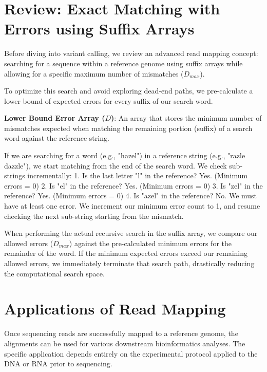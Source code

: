 

\section{Review: Exact Matching with Errors using Suffix Arrays}

Before diving into variant calling, we review an advanced read mapping concept: searching for a sequence within a reference genome using suffix arrays while allowing for a specific maximum number of mismatches (\( D_{max} \)). 

To optimize this search and avoid exploring dead-end paths, we pre-calculate a lower bound of expected errors for every suffix of our search word. 

\begin{important}
  \textbf{Lower Bound Error Array (\(D\))}: An array that stores the minimum number of mismatches expected when matching the remaining portion (suffix) of a search word against the reference string. 
\end{important}

If we are searching for a word (e.g., "hazel") in a reference string (e.g., "razle dazzle"), we start matching from the end of the search word. We check sub-strings incrementally: 
1. Is the last letter "l" in the reference? Yes. (Minimum errors = 0)
2. Is "el" in the reference? Yes. (Minimum errors = 0)
3. Is "zel" in the reference? Yes. (Minimum errors = 0)
4. Is "azel" in the reference? No. We must have at least one error. We increment our minimum error count to 1, and resume checking the next sub-string starting from the mismatch.

When performing the actual recursive search in the suffix array, we compare our allowed errors (\( D_{max} \)) against the pre-calculated minimum errors for the remainder of the word. \sta If the minimum expected errors exceed our remaining allowed errors, we immediately terminate that search path, drastically reducing the computational search space.

\section{Applications of Read Mapping}

Once sequencing reads are successfully mapped to a reference genome, the alignments can be used for various downstream bioinformatics analyses. The specific application depends entirely on the experimental protocol applied to the DNA or RNA prior to sequencing.

